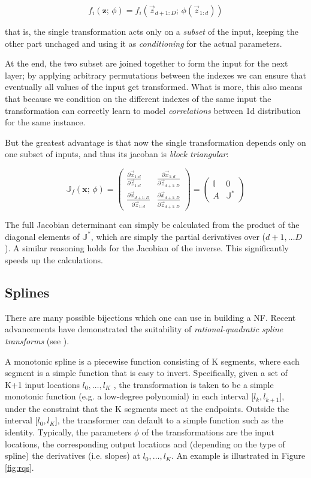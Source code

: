 \[
f_i(\mathbf{z}; \, \phi) = f_i(\vec z_{d+1:D}; \, \phi(\vec z_{1:d}))
\]

that is, the single transformation acts only on a \emph{subset} of the input, keeping the other part unchaged and using it as \emph{conditioning} for the actual parameters. 

At the end, the two subset are joined together to form the input for the next layer; by applying arbitrary permutations between the indexes we can ensure that eventually all values of the input get transformed. What is more, this also means that because we condition on the different indexes of the same input the transformation can correctly learn to model \emph{correlations} between 1d distribution for the same instance.

But the greatest advantage is that now the single transformation depends only on one subset of inputs, and thus its jacoban is \emph{block triangular}:

\[
\mathbb{J}_{f}(\mathbf{x}; \, \phi) = 
\begin{pmatrix}
\frac{\partial \vec x_{1:d}}{\partial \vec z_{1:d}} & \frac{\partial \vec x_{1:d}}{\partial \vec z_{d+1:D}}\\
\frac{\partial \vec x_{d+1:D}}{\partial \vec z_{1:d}} & \frac{\partial \vec x_{d+1:D}}{\partial \vec z_{d+1:D}}
\end{pmatrix}
=
\begin{pmatrix}
\mathbb{I} & 0\\
A & \mathbb{J}^*
\end{pmatrix}
\]

The full Jacobian determinant can simply be calculated from the product of the diagonal elements of $\mathbb{J}^*$, which are simply the partial derivatives over ($d+1, \dots D$). A similar reasoning holds for the Jacobian of the inverse.
This significantly speeds up the calculations.

\subsection{Splines}

There are many possible bijections which one can use in building a NF. Recent advancements have demonstrated the suitability of \emph{rational-quadratic spline transforms} (see \cite{durkan}). 

A monotonic spline is a piecewise function consisting of K segments, where each segment is a simple function that is easy to invert. Specifically, given a set of K+1 input locations $l_{0}, \dots, l_K$ , the transformation
is taken to be a simple monotonic function (e.g. a low-degree polynomial) in each interval
[$l_{k}, l_{k+1}$], under the constraint that the K segments meet at the endpoints.
Outside the interval [$l_{0}, l_K$], the transformer can default to a simple function such as the
identity. Typically, the parameters $\phi$ of the transformations are the input locations, 
the corresponding output locations and (depending on the type of spline) the
derivatives (i.e. slopes) at $l_{0}, \dots, l_K$. An example is illustrated in Figure \ref{fig:rqs}.

